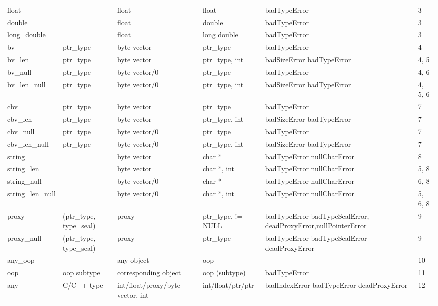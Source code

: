 \documentclass[letterpaper,10pt,english]{sphinxmanual}
\begin{document}
\noindent\begin{tabulary}{\linewidth}{p{2cm} p{2cm} p{2cm} p{2cm} p{3cm} p{2cm}}
\hline
{}\relax &\relax &\relax &\relax &\relax &\relax \\
\hline
float
&&
float
&
float
&
badTypeError
&
3
\\
\hline
double
&&
float
&
double
&
badTypeError
&
3
\\
\hline
long\_double
&&
float
&
long double
&
badTypeError
&
3
\\
\hline
bv
&
ptr\_type
&
byte vector
&
ptr\_type
&
badTypeError
&
4
\\
\hline
bv\_len
&
ptr\_type
&
byte vector
&
ptr\_type, int
&
badSizeError badTypeError
&
4, 5
\\
\hline
bv\_null
&
ptr\_type
&
byte vector/0
&
ptr\_type
&
badTypeError
&
4, 6
\\
\hline
bv\_len\_null
&
ptr\_type
&
byte vector/0
&
ptr\_type, int
&
badSizeError badTypeError
&
4, 5, 6
\\
\hline
cbv
&
ptr\_type
&
byte vector
&
ptr\_type
&
badTypeError
&
7
\\
\hline
cbv\_len
&
ptr\_type
&
byte vector
&
ptr\_type, int
&
badSizeError badTypeError
&
7
\\
\hline
cbv\_null
&
ptr\_type
&
byte vector/0
&
ptr\_type
&
badTypeError
&
7
\\
\hline
cbv\_len\_null
&
ptr\_type
&
byte vector/0
&
ptr\_type, int
&
badSizeError badTypeError
&
7
\\
\hline
string
&&
byte vector
&
char *
&
badTypeError nullCharError
&
8
\\
\hline
string\_len
&&
byte vector
&
char *, int
&
badTypeError nullCharError
&
5, 8
\\
\hline
string\_null
&&
byte vector/0
&
char *
&
badTypeError nullCharError
&
6, 8
\\
\hline
string\_len\_null
&&
byte vector/0
&
char *, int
&
badTypeError nullCharError
&
5, 6, 8
\\
\hline
proxy
&
(ptr\_type, type\_seal)
&
proxy
&
ptr\_type, != NULL
&
badTypeError badTypeSealError, deadProxyError,nullPointerError
&
9
\\
\hline
proxy\_null
&
(ptr\_type, type\_seal)
&
proxy
&
ptr\_type
&
badTypeError badTypeSealError deadProxyError
&
9
\\
\hline
any\_oop
&&
any object
&
oop
&&
10
\\
\hline
oop
&
oop subtype
&
corresponding object
&
oop (subtype)
&
badTypeError
&
11
\\
\hline
any
&
C/C++ type
&
int/float/proxy/byte-vector, int
&
int/float/ptr/ptr
&
badIndexError badTypeError deadProxyError
&
12
\\
\hline\end{tabulary}
\end{document}
